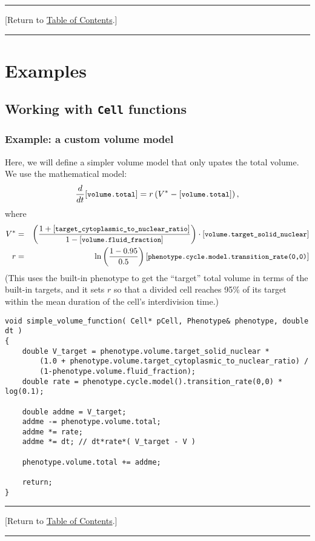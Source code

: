 \documentclass[12pt]{article}
\newcommand{\beq}{\begin{equation}}
\newcommand{\eeq}{\end{equation}}
\newcommand{\beqa}{\begin{eqnarray}}
\newcommand{\eeqa}{\end{eqnarray}}
\renewcommand{\tt}[1]{{\small \left[\texttt{#1}\right] }}
\newcommand{\TOClink}{\begin{center}\hrule\vskip-5pt\phantom{.}\hfill[Return to \hyperlink{TOC}{Table of Contents}.]\hfill\phantom{.}\vskip3pt\hrule\end{center}}
\begin{document}
\TOClink 

\section{Examples}
\label{sec:Examples}

\subsection{Working with \texttt{Cell} functions}

\subsubsection{Example: a custom volume model}
\label{sec:Examples:volume_model}
Here, we will define a simpler volume model that only 
upates the total volume. We 
use the mathematical model: 
\beq
\frac{d}{dt} 
\tt{volume.total} = r \left( V^* - \tt{volume.total} \right),  
\eeq
where 
\beqa
V^* & = & \left( \frac{1 + \tt{target\_cytoplasmic\_to\_nuclear\_ratio}}
{1 - \tt{volume.fluid\_fraction}} \right) \cdot 
\tt{volume.target\_solid\_nuclear} \\
r & = & 
\ln\left( 
\frac{1 - 0.95}{0.5}
\right) \tt{phenotype.cycle.model.transition\_rate(0,0)} 
\eeqa
(This uses the built-in phenotype to get the ``target'' total volume in 
terms of the built-in  targets, and it sets $r$ so that a divided cell reaches 
95\% of its target within the mean duration of the cell's interdivision 
time.) 
\begin{verbatim}
void simple_volume_function( Cell* pCell, Phenotype& phenotype, double dt )
{
    double V_target = phenotype.volume.target_solid_nuclear * 
        (1.0 + phenotype.volume.target_cytoplasmic_to_nuclear_ratio) / 
        (1-phenotype.volume.fluid_fraction); 
    double rate = phenotype.cycle.model().transition_rate(0,0) * log(0.1); 
    
    double addme = V_target; 
    addme -= phenotype.volume.total; 
    addme *= rate; 
    addme *= dt; // dt*rate*( V_target - V )
    
    phenotype.volume.total += addme; 
    
    return; 
}
\end{verbatim}

\TOClink 
\end{document}
